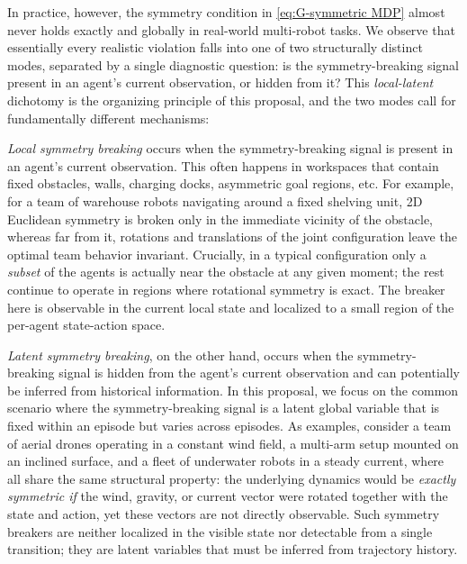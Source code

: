 \documentclass[11pt]{article}
\begin{document}
In practice, however, the symmetry condition in \eqref{eq:G-symmetric MDP} almost never holds exactly and globally in real-world multi-robot tasks.
We observe that essentially every realistic violation falls into one of two structurally distinct modes, separated by a single diagnostic question:
is the symmetry-breaking signal present in an agent's current observation, or hidden from it? 
This {\em local-latent} dichotomy is the organizing principle of this proposal, and the two modes call for fundamentally different mechanisms:

{\em Local symmetry breaking} occurs when the symmetry-breaking signal is present in an agent's current observation.
This often happens in workspaces that contain fixed obstacles, walls, charging docks, asymmetric goal regions, etc. 
For example, for a team of warehouse robots navigating around a fixed shelving unit, 2D Euclidean symmetry is broken only in the immediate vicinity of the obstacle, whereas far from it, rotations and translations of the joint configuration leave the optimal team behavior invariant.
Crucially, in a typical configuration only a {\em subset} of the agents is actually near the obstacle at any given moment; the rest continue to operate in regions where rotational symmetry is exact. The breaker here is observable in the current
local state and localized to a small region of the per-agent state-action space.

{\em Latent symmetry breaking}, on the other hand, occurs when the symmetry-breaking signal is hidden from the agent's current observation and can potentially be inferred from historical information.
In this proposal, we focus on the common scenario where the symmetry-breaking signal is a latent global variable that is fixed within an episode but varies across episodes.
As examples, consider a team of aerial drones operating in a constant wind field, a multi-arm setup mounted on an inclined surface, and a fleet of underwater robots in a steady current, where all share the same structural property: the underlying dynamics would be {\em exactly symmetric if} the wind, gravity, or current vector were rotated together with the state and action, yet these vectors are not directly observable.
Such symmetry breakers are neither localized in the visible
state nor detectable from a single transition; they are latent variables that must be inferred from trajectory history.
\end{document}
